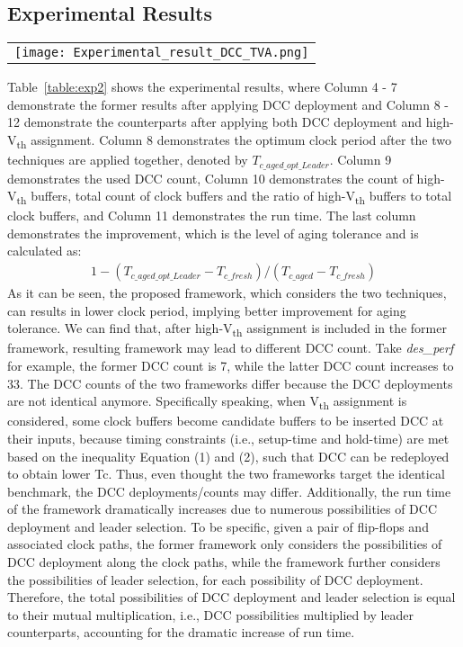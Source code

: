 \subsection{Experimental Results}
\begin{table*}
\centering
\caption{Experimental results of DCC deployment and high-V\textsubscript{th} assignment}
	\begin{tabular}{l}
	\texttt{[image: Experimental\_result\_DCC\_TVA.png]}
	\end{tabular}
\label{table:exp2}
\end{table*}

Table~\ref{table:exp2} shows the experimental results, where Column 4 - 7 demonstrate the former results after applying DCC deployment  and Column 8 - 12 demonstrate the counterparts after applying both DCC deployment and high-V\textsubscript{th} assignment. Column 8 demonstrates the optimum clock period after the two techniques are applied together, denoted by $T_{c\_aged\_opt\_Leader}$. Column 9 demonstrates the used DCC count, Column 10 demonstrates the count of high-V\textsubscript{th} buffers, total count of clock buffers and the ratio of high-V\textsubscript{th} buffers to total clock buffers, and Column 11 demonstrates the run time. The last column demonstrates the improvement, which is the level of aging tolerance and is calculated as:
\begin{gather*}
1 - (T_{c\_aged\_opt\_Leader} - T_{c\_fresh}) / (T_{c\_aged} - T_{c\_fresh})
\end{gather*}
As it can be seen, the proposed framework, which considers the two techniques, can results in lower clock period, implying better improvement for aging tolerance. We can find that, after high-V\textsubscript{th} assignment is included in the former framework, resulting framework may lead to different DCC count. Take \textit{des\_perf} for example, the former DCC count is 7, while the latter DCC count increases to 33. The DCC counts of the two frameworks differ because the DCC deployments are not identical anymore. Specifically speaking, when V\textsubscript{th} assignment is considered, some clock buffers become candidate buffers to be inserted DCC at their inputs, because timing constraints (i.e., setup-time and hold-time) are met based on the inequality Equation (1) and (2), such that DCC can be redeployed to obtain lower Tc. Thus, even thought the two frameworks target the identical benchmark, the DCC deployments/counts may differ. Additionally, the run time of the framework dramatically increases due to numerous possibilities of DCC deployment and leader selection. To be specific, given a pair of flip-flops and associated clock paths, the former framework only considers the possibilities of DCC deployment along the clock paths, while the framework further considers the possibilities of leader selection, for each possibility of DCC deployment. Therefore, the total  possibilities of DCC deployment and leader selection is equal to their mutual multiplication, i.e., DCC possibilities multiplied by leader counterparts, accounting for the dramatic increase of run time.
